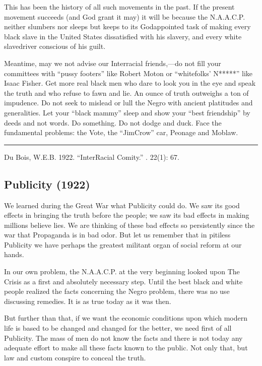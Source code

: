 \documentclass[letterpaper,10pt,english]{jupyterBook}
\begin{document}
\sphinxAtStartPar
This has been the history of all such movements in the past. If the present movement succeeds (and God grant it may) it will be because the N.A.A.C.P. neither slumbers nor sleeps but keeps to its God\sphinxhyphen{}appointed task of making every black slave in the United States dissatisfied with his slavery, and every white slave\sphinxhyphen{}driver conscious of his guilt.

\sphinxAtStartPar
Meantime, may we not advise our Inter\sphinxhyphen{}racial friends,—do not fill your committees with “pussy footers” like Robert Moton or “white\sphinxhyphen{}folks’ N*****” like Isaac Fisher. Get more real black men who dare to look you in the eye and speak the truth and who refuse to fawn and lie. An ounce of truth outweighs a ton of impudence. Do not seek to mislead or lull the Negro with ancient platitudes and generalities. Let your “black mam­my” sleep and show your “best friendship” by deeds and not words. Do something. Do not dodge and duck. Face the fundamental problems: the Vote, the “Jim\sphinxhyphen{}Crow” car, Peonage and Mob\sphinxhyphen{}law.


\bigskip\hrule\bigskip


\sphinxAtStartPar
{} Du Bois, W.E.B. 1922. “Inter\sphinxhyphen{}Racial Comity.” . 22(1): 6\sphinxhyphen{}7.


\subsection{Publicity (1922)}
\label{\detokenize{Volumes/24/01/publicity:publicity-1922}}\label{\detokenize{Volumes/24/01/publicity::doc}}
\sphinxAtStartPar
We learned during the Great War what Publicity could do. We saw its good effects in bringing the truth before the people; we saw its bad effects in making millions believe lies. We are thinking of these bad effects so persistently since the war that Propaganda is in bad odor. But let us remember that in pitiless Publicity we have perhaps the greatest militant organ of social reform at our hands.

\sphinxAtStartPar
In our own problem, the N.A.A.C.P. at the very beginning looked upon The Crisis as a first and absolutely necessary step. Until the best black and white people realized the facts concerning the Negro problem, there was no use discussing remedies. It is as true today as it was then.

\sphinxAtStartPar
But further than that, if we want the economic conditions upon which modern life is based to be changed and changed for the better, we need first of all Publicity. The mass of men do not know the facts and there is not today any adequate effort to make all these facts known to the public. Not only that, but law and custom conspire to conceal the truth.
\end{document}
